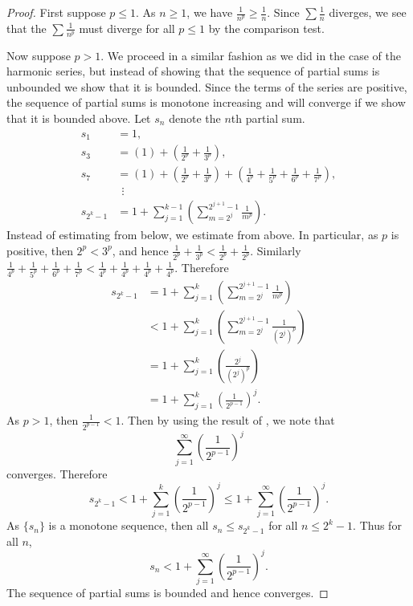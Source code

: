 \documentclass[12pt]{book}
\begin{document}
\begin{proof}
First suppose $p \leq 1$.
As $n \geq 1$, we have
$\frac{1}{n^p} \geq \frac{1}{n}$.
Since
$\sum \frac{1}{n}$ diverges, we see that the 
$\sum \frac{1}{n^p}$ must diverge for all $p \leq 1$ by the comparison test.

Now suppose $p > 1$.
We proceed in a similar fashion as we did in the case of the
harmonic series, but instead of showing that the sequence
of partial sums is unbounded we show that it is bounded.
Since the terms of the series are positive, the sequence of partial sums
is monotone increasing and will converge if we show that it is bounded
above.
Let $s_n$ denote the $n$th partial sum.
\begin{align*}
 s_1 & = 1 , \\
 s_3 & = \left( 1 \right) + \left( \frac{1}{2^p} + \frac{1}{3^p} \right) , \\
 s_7 & = \left( 1 \right) + \left( \frac{1}{2^p} + \frac{1}{3^p} \right) +
        \left( \frac{1}{4^p} + \frac{1}{5^p} + \frac{1}{6^p} + \frac{1}{7^p} \right) , \\
& ~~ \vdots \\
 s_{2^k - 1} &= 
1 + 
\sum_{j=1}^{k-1}
\left(
\sum_{m=2^j}^{2^{j+1}-1} \frac{1}{m^p}
\right) .
\end{align*}
Instead of estimating from below, we estimate from above.
In particular,
as $p$ is positive, then $2^p < 3^p$, and hence
$\frac{1}{2^p} + \frac{1}{3^p} <
\frac{1}{2^p} + \frac{1}{2^p}$.
Similarly
$\frac{1}{4^p} + \frac{1}{5^p} +
\frac{1}{6^p} + \frac{1}{7^p} <
\frac{1}{4^p} + \frac{1}{4^p} +
\frac{1}{4^p} + \frac{1}{4^p}$.
Therefore
\begin{equation*}
\begin{split}
s_{2^k-1}
& =
1+
\sum_{j=1}^k
\left(
\sum_{m=2^{j}}^{2^{j+1}-1} \frac{1}{m^p}
\right) 
\\
& <
1+
\sum_{j=1}^k
\left(
\sum_{m=2^{j}}^{2^{j+1}-1} \frac{1}{{(2^j)}^p}
\right) 
\\
& =
1+
\sum_{j=1}^k
\left(
\frac{2^j}{{(2^j)}^p}
\right) 
\\
& =
1+
\sum_{j=1}^k
{\left(
\frac{1}{2^{p-1}}
\right)}^j .
\end{split}
\end{equation*}
As $p > 1$, then $\frac{1}{2^{p-1}} < 1$.
Then by using the result of
, we note that
\begin{equation*}
\sum_{j=1}^\infty
{\left(
\frac{1}{2^{p-1}}
\right)}^j
\end{equation*}
converges.
Therefore
\begin{equation*}
s_{2^k-1} < 
1+
\sum_{j=1}^k
{\left(
\frac{1}{2^{p-1}}
\right)}^j 
\leq 
1+
\sum_{j=1}^\infty
{\left(
\frac{1}{2^{p-1}}
\right)}^j .
\end{equation*}
As $\{ s_n \}$ is a monotone sequence, then all $s_n \leq s_{2^k-1}$
for all $n \leq 2^k-1$.
Thus for all $n$,
\begin{equation*}
s_n < 
1+
\sum_{j=1}^\infty
{\left(
\frac{1}{2^{p-1}}
\right)}^j .
\end{equation*}
The sequence of partial sums is bounded and hence converges.
\end{proof}
\end{document}
